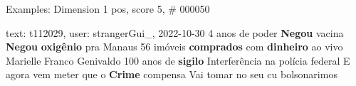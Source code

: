 \begin{frame}{Examples: Dimension 1 pos, score 5, \# 000050}
\footnotesize
\begin{exampleblock}{text: t112029, user: strangerGui\_, 2022-10-30}
4 anos de poder \textbf{Negou} vacina \textbf{Negou} \textbf{oxigênio} pra 
Manaus 56 imóveis \textbf{comprados} com \textbf{dinheiro} ao vivo Marielle 
Franco Genivaldo 100 anos de \textbf{sigilo} Interferência na polícia federal E 
agora vem meter que o \textbf{Crime} compensa Vai tomar no seu cu bolsonarimos 
\end{exampleblock}
\end{frame}
